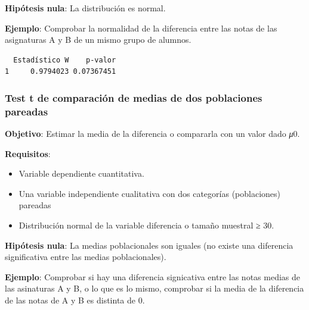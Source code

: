 \documentclass[
  a4paper,
]{scrreport}
\newenvironment{Shaded}{\begin{snugshade}}{\end{snugshade}}
\newcommand{\AttributeTok}[1]{\textcolor[rgb]{0.40,0.45,0.13}{#1}}
\newcommand{\FunctionTok}[1]{\textcolor[rgb]{0.28,0.35,0.67}{#1}}
\newcommand{\NormalTok}[1]{\textcolor[rgb]{0.00,0.23,0.31}{#1}}
\newcommand{\OtherTok}[1]{\textcolor[rgb]{0.00,0.23,0.31}{#1}}
\newcommand{\SpecialCharTok}[1]{\textcolor[rgb]{0.37,0.37,0.37}{#1}}
\newcommand{\StringTok}[1]{\textcolor[rgb]{0.13,0.47,0.30}{#1}}
\providecommand{\tightlist}{%
  \setlength{\itemsep}{0pt}\setlength{\parskip}{0pt}}\usepackage{longtable,booktabs,array}
\theoremstyle{definition}
\theoremstyle{definition}
\theoremstyle{remark}
\begin{document}
\textbf{Hipótesis nula}: La distribución es normal.

\textbf{Ejemplo}: Comprobar la normalidad de la diferencia entre las
notas de las asignaturas A y B de un mismo grupo de alumnos.

\begin{Shaded}
\end{Shaded}

\begin{verbatim}
  Estadístico W    p-valor
1     0.9794023 0.07367451
\end{verbatim}

\hypertarget{test-t-de-comparaciuxf3n-de-medias-de-dos-poblaciones-pareadas}{%
\subsubsection{Test t de comparación de medias de dos poblaciones
pareadas}\label{test-t-de-comparaciuxf3n-de-medias-de-dos-poblaciones-pareadas}}

\textbf{Objetivo}: Estimar la media de la diferencia o compararla con un
valor dado \emph{μ}0.

\textbf{Requisitos}:

\begin{itemize}
\tightlist
\item
  Variable dependiente cuantitativa.
\item
  Una variable independiente cualitativa con dos categorías
  (poblaciones) pareadas
\item
  Distribución normal de la variable diferencia o tamaño muestral ≥ 30.
\end{itemize}

\textbf{Hipótesis nula}: La medias poblacionales son iguales (no existe
una diferencia significativa entre las medias poblacionales).

\textbf{Ejemplo}: Comprobar si hay una diferencia signicativa entre las
notas medias de las asinaturas A y B, o lo que es lo mismo, comprobar si
la media de la diferencia de las notas de A y B es distinta de 0.
\end{document}
